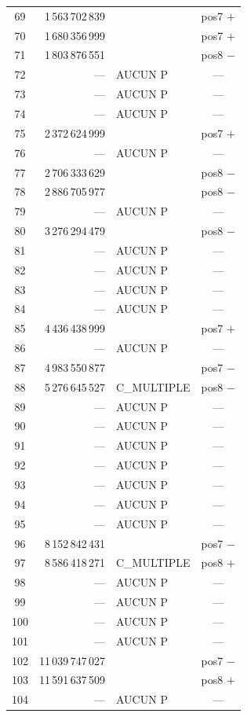 \documentclass[11pt,a4paper]{article}
\begin{document}
\begin{boitenote}
\begin{boitenote}[Inspiration]
\begin{boitenote}
\begin{boitenote}
{\begin{longtable}{@{}c r l c@{}}
69 & 1\,563\,702\,839 & & pos7 $+$ \\
70 & 1\,680\,356\,999 & & pos7 $+$ \\
71 & 1\,803\,876\,551 & & pos8 $-$ \\
72 & --- & AUCUN P & --- \\
73 & --- & AUCUN P & --- \\
74 & --- & AUCUN P & --- \\
75 & 2\,372\,624\,999 & & pos7 $+$ \\
76 & --- & AUCUN P & --- \\
77 & 2\,706\,333\,629 & & pos8 $-$ \\
78 & 2\,886\,705\,977 & & pos8 $-$ \\
79 & --- & AUCUN P & --- \\
80 & 3\,276\,294\,479 & & pos8 $-$ \\
81 & --- & AUCUN P & --- \\
82 & --- & AUCUN P & --- \\
83 & --- & AUCUN P & --- \\
84 & --- & AUCUN P & --- \\
85 & 4\,436\,438\,999 & & pos7 $+$ \\
86 & --- & AUCUN P & --- \\
87 & 4\,983\,550\,877 & & pos7 $-$ \\
88 & 5\,276\,645\,527 & C\_MULTIPLE & pos8 $-$ \\
89 & --- & AUCUN P & --- \\
90 & --- & AUCUN P & --- \\
91 & --- & AUCUN P & --- \\
92 & --- & AUCUN P & --- \\
93 & --- & AUCUN P & --- \\
94 & --- & AUCUN P & --- \\
95 & --- & AUCUN P & --- \\
96 & 8\,152\,842\,431 & & pos7 $-$ \\
97 & 8\,586\,418\,271 & C\_MULTIPLE & pos8 $+$ \\
98 & --- & AUCUN P & --- \\
99 & --- & AUCUN P & --- \\
100 & --- & AUCUN P & --- \\
101 & --- & AUCUN P & --- \\
102 & 11\,039\,747\,027 & & pos7 $-$ \\
103 & 11\,591\,637\,509 & & pos8 $+$ \\
104 & --- & AUCUN P & --- \\

\end{longtable}}
\end{boitenote}
\end{boitenote}
\end{boitenote}
\end{boitenote}
\end{document}

